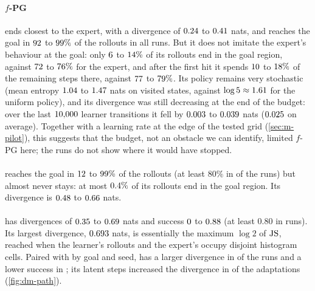 \paragraph{$f$-PG} ends closest to the expert, with a divergence of $\vn{s12.fpg.js.lo}{0.24}$ to $\vn{s12.fpg.js.hi}{0.41}$ nats, and reaches the goal in $\vn{s12.fpg.succ_pct.lo}{92}$ to $\vn{s12.fpg.succ_pct.hi}{99}\%$ of the rollouts in all  runs.
But it does not imitate the expert's behaviour at the goal: only $\vn{s12.fpg.fig_pct.lo}{6}$ to $\vn{s12.fpg.fig_pct.hi}{14}\%$ of its rollouts end in the goal region, against $\vn{s12.exp.fig_pct.lo}{72}$ to $\vn{s12.exp.fig_pct.hi}{76}\%$ for the expert, and after the first hit it spends $\vn{s12.fpg.post_pct.lo}{10}$ to $\vn{s12.fpg.post_pct.hi}{18}\%$ of the remaining steps there, against $\vn{s12.exp.post_pct.lo}{77}$ to $\vn{s12.exp.post_pct.hi}{79}\%$.
Its policy remains very stochastic (mean entropy $\vn{s12.fpg.ent.lo}{1.04}$ to $\vn{s12.fpg.ent.hi}{1.47}$ nats on visited states, against $\log5\approx\vn{const.log5}{1.61}$ for the uniform policy), and its divergence was still decreasing at the end of the budget: over the last $\vn{fpg.interval.c}{10{,}000}$ learner transitions it fell by $\vn{s12.fpg.dec.lo}{0.003}$ to $\vn{s12.fpg.dec.hi}{0.039}$ nats ($\vn{s12.fpg.dec_mean}{0.025}$ on average).
Together with a learning rate at the edge of the tested grid (\cref{sec:m-pilot}), this suggests that the budget, not an obstacle we can identify, limited $f$-PG here; the runs do not show where it would have stopped.

\paragraph{\ERFB} reaches the goal in $\vn{s12.er.succ_pct.lo}{12}$ to $\vn{s12.er.succ_pct.hi}{99}\%$ of the rollouts (at least $80\%$ in  of the  runs) but almost never stays: at most $\vn{s12.er.fig_max_pct}{0.4}\%$ of its rollouts end in the goal region. Its divergence is $\vn{s12.er.js.lo}{0.48}$ to $\vn{s12.er.js.hi}{0.66}$ nats.

\paragraph{\DMFB} has divergences of $\vn{s12.dm.js.lo}{0.35}$ to $\vn{s12.dm.js.hi}{0.69}$ nats and success $\vn{s12.dm.succ.lo}{0}$ to $\vn{s12.dm.succ.hi}{0.88}$ (at least $0.80$ in  runs). Its largest divergence, $\vn{s12.dm.max}{0.693}$ nats, is essentially the maximum $\log2$ of $\JS$, reached when the learner's rollouts and the expert's occupy disjoint histogram cells.
Paired with \ERFB{} by goal and seed, \DMFB{} has a larger divergence in  of the  runs and a lower success in ; its latent steps increased the divergence in  of the  adaptations (\cref{fig:dm-path}).

